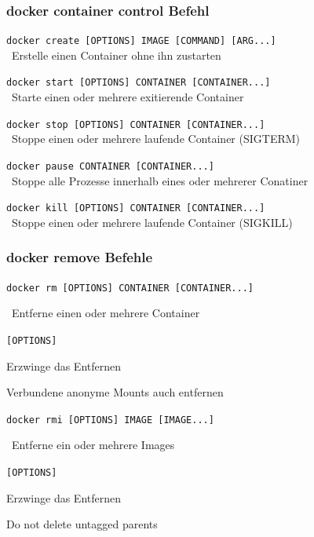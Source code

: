 \documentclass[22pt]{beamer}
\newcommand{\code}[1]{\colorbox{gray!10}{\texttt{#1}}}
\newcommand{\desclabel}[1]{\textcolor{cyan}{#1}}
\begin{document}
\begin{frame}
    \frametitle{docker container control Befehl}

    \code{docker create [OPTIONS] IMAGE [COMMAND] [ARG...]}\\
    \-  \ Erstelle einen Container ohne ihn zustarten \medskip

    \code{docker start [OPTIONS] CONTAINER [CONTAINER...]}\\
    \-  \ Starte einen oder mehrere exitierende Container \medskip

    \code{docker stop [OPTIONS] CONTAINER [CONTAINER...]}\\
    \-  \ Stoppe einen oder mehrere laufende Container (SIGTERM) \medskip

    \code{docker pause CONTAINER [CONTAINER...]}\\
    \-  \ Stoppe alle Prozesse innerhalb eines oder mehrerer Conatiner \medskip

    \code{docker kill [OPTIONS] CONTAINER [CONTAINER...]}\\
    \-  \ Stoppe einen oder mehrere laufende Container (SIGKILL) \medskip
    
\end{frame}

\begin{frame}
    \frametitle{docker remove Befehle}
    \code{docker rm [OPTIONS] CONTAINER [CONTAINER...]}

    \- \ Entferne einen oder mehrere Container\vspace{5pt}

    \code{[OPTIONS]}
    \begin{description}[labelindent=0.5cm, style=unboxed, labelwidth=\widthof{-v, -\,-volumess}, leftmargin=!]
        \item[\desclabel{-f, -\,-force}] Erzwinge das Entfernen
        \item[\desclabel{-v, -\,-volumes}] Verbundene anonyme Mounts auch entfernen
    \end{description}\medskip\medskip
    \code{docker rmi [OPTIONS] IMAGE [IMAGE...]}

    \- \ Entferne ein oder mehrere Images\vspace{5pt}

    \code{[OPTIONS]}
    \begin{description}[labelindent=0.5cm, style=unboxed, labelwidth=\widthof{-\,-no-prunes}, leftmargin=!]
        \item[\desclabel{-f, -\,-force}] Erzwinge das Entfernen
        \item[\desclabel{-\,-no-prune}] Do not delete untagged parents
    \end{description}
\end{frame}
\end{document}
